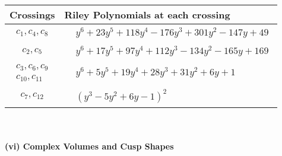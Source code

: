 \documentclass[1p]{elsarticle_modified}
\theoremstyle{definition}
\begin{document}
\begin{tabular}{m{50pt}|m{274pt}}
Crossings & \hspace{64pt}Riley Polynomials at each crossing \\
\hline $$\begin{aligned}c_{1},c_{4},c_{8}\end{aligned}$$&$\begin{aligned}
&y^6+23 y^5+118 y^4-176 y^3+301 y^2-147 y+49
\end{aligned}$\\
\hline $$\begin{aligned}c_{2},c_{5}\end{aligned}$$&$\begin{aligned}
&y^6+17 y^5+97 y^4+112 y^3-134 y^2-165 y+169
\end{aligned}$\\
\hline $$\begin{aligned}c_{3},c_{6},c_{9}\\c_{10},c_{11}\end{aligned}$$&$\begin{aligned}
&y^6+5 y^5+19 y^4+28 y^3+31 y^2+6 y+1
\end{aligned}$\\
\hline $$\begin{aligned}c_{7},c_{12}\end{aligned}$$&$\begin{aligned}
&(y^3-5 y^2+6 y-1)^2
\end{aligned}$\\
\hline
\end{tabular}\\~\\
\newpage\flushleft \textbf{(vi) Complex Volumes and Cusp Shapes}
\end{document}
